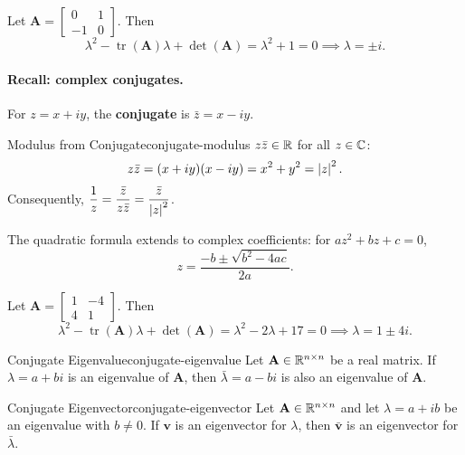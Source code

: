 \begin{example}
  Let $\mathbf{A} =
    \begin{bmatrix}
      0 & 1 \\ -1 & 0
    \end{bmatrix}
  $. Then
  \[
    \lambda^2 - \operatorname{tr}(\mathbf{A})\lambda + \det(\mathbf{A}) = \lambda^2 + 1 = 0
    \implies \lambda = \pm i.
  \]
\end{example}

\paragraph{Recall: complex conjugates.} For $z = x + iy$, the \textbf{conjugate} is $\bar z = x - iy$.

\begin{theorem}{Modulus from Conjugate}{conjugate-modulus}
  $z \bar z \in \mathbb{R}$ for all $z \in \mathbb{C}$:
  \[
    z \bar z = (x + iy)(x - iy) = x^2 + y^2 = \left\lvert z \right\rvert^2.
  \]
  Consequently, $\dfrac{1}{z} = \dfrac{\bar z}{z \bar z} = \dfrac{\bar z}{\left\lvert z \right\rvert^2}$.
\end{theorem}

The quadratic formula extends to complex coefficients: for $az^2 + bz + c = 0$,
\[
  z = \frac{-b \pm \sqrt{b^2 - 4ac}}{2a}.
\]

\begin{example}
  Let $\mathbf{A} =
    \begin{bmatrix}
      1 & -4 \\ 4 & 1
    \end{bmatrix}
  $. Then
  \[
    \lambda^2 - \operatorname{tr}(\mathbf{A})\lambda + \det(\mathbf{A}) = \lambda^2 - 2\lambda + 17 = 0
    \implies \lambda = 1 \pm 4i.
  \]
\end{example}

\begin{theorem}{Conjugate Eigenvalue}{conjugate-eigenvalue}
  Let $\mathbf{A} \in \mathbb{R}^{n \times n}$ be a real matrix. If $\lambda = a + bi$ is an eigenvalue of $\mathbf{A}$, then $\bar \lambda = a - bi$ is also an eigenvalue of $\mathbf{A}$.
\end{theorem}

\begin{theorem}{Conjugate Eigenvector}{conjugate-eigenvector}
  Let $\mathbf{A} \in \mathbb{R}^{n \times n}$ and let $\lambda = a + ib$ be an eigenvalue with $b \neq 0$. If $\mathbf{v}$ is an eigenvector for $\lambda$, then $\bar{\mathbf{v}}$ is an eigenvector for $\bar \lambda$.
\end{theorem}

